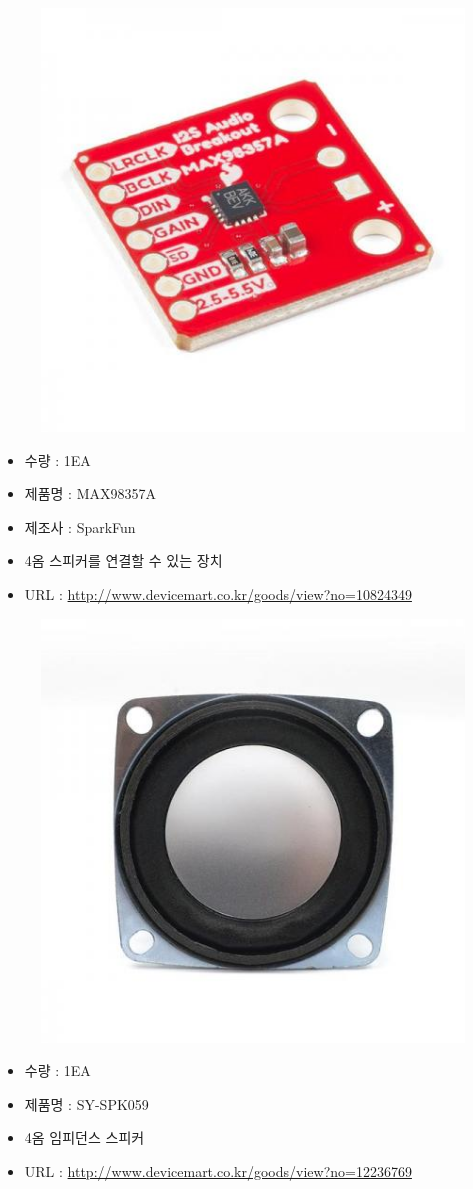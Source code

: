 \documentclass[a4paper, 11pt]{article}
\begin{document}
\begin{figure}[h!]
\centering
\includegraphics[scale=0.6]{./Figure/CF5.jpg}
\end{figure}


\begin{itemize}
\item 수량 : 1EA
\item 제품명 : MAX98357A
\item 제조사 : SparkFun
\item 4옴 스피커를 연결할 수 있는 장치
\item URL : \url{http://www.devicemart.co.kr/goods/view?no=10824349}
\end{itemize}

\begin{figure}[h!]
\centering
\includegraphics[scale=0.6]{./Figure/CF6.jpg}
\end{figure}


\begin{itemize}
\item 수량 : 1EA
\item 제품명 : SY-SPK059
\item 4옴 임피던스 스피커
\item URL : \url{http://www.devicemart.co.kr/goods/view?no=12236769}
\end{itemize}
\end{document}
